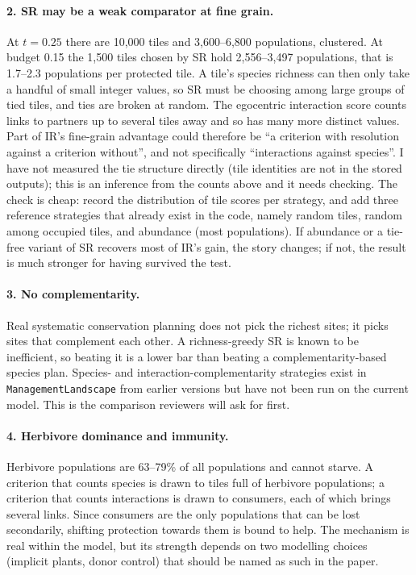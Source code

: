 \documentclass[11pt,a4paper]{article}
\newcommand{\code}[1]{\texttt{\small #1}}
\begin{document}
\paragraph{2. SR may be a weak comparator at fine grain.} At $t=0.25$ there are 10,000 tiles and
3,600--6,800 populations, clustered. At budget 0.15 the 1,500 tiles chosen by SR hold 2,556--3,497
populations, that is 1.7--2.3 populations per protected tile. A tile's species richness can then only take a
handful of small integer values, so SR must be choosing among large groups of tied tiles, and ties are
broken at random. The egocentric interaction score counts links to partners up to several tiles away and so
has many more distinct values. Part of IR's fine-grain advantage could therefore be ``a criterion with
resolution against a criterion without'', and not specifically ``interactions against species''. I have not
measured the tie structure directly (tile identities are not in the stored outputs); this is an inference
from the counts above and it needs checking. The check is cheap: record the distribution of tile scores per
strategy, and add three reference strategies that already exist in the code, namely random tiles, random
among occupied tiles, and abundance (most populations). If abundance or a tie-free variant of SR recovers
most of IR's gain, the story changes; if not, the result is much stronger for having survived the test.

\paragraph{3. No complementarity.} Real systematic conservation planning does not pick the richest sites;
it picks sites that complement each other. A richness-greedy SR is known to be inefficient, so beating it is
a lower bar than beating a complementarity-based species plan. Species- and interaction-complementarity
strategies exist in \code{ManagementLandscape} from earlier versions but have not been run on the current
model. This is the comparison reviewers will ask for first.

\paragraph{4. Herbivore dominance and immunity.} Herbivore populations are 63--79\% of all populations and
cannot starve. A criterion that counts species is drawn to tiles full of herbivore populations; a criterion
that counts interactions is drawn to consumers, each of which brings several links. Since consumers are the
only populations that can be lost secondarily, shifting protection towards them is bound to help. The
mechanism is real within the model, but its strength depends on two modelling choices (implicit plants, donor
control) that should be named as such in the paper.
\end{document}
